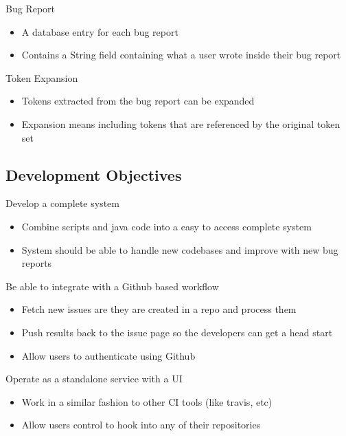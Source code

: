 \documentclass[ignorenonframetext,]{beamer}
\providecommand{\tightlist}{%
  \setlength{\itemsep}{0pt}\setlength{\parskip}{0pt}}
\begin{document}
\begin{frame}{Bug Report}

\begin{itemize}
\tightlist
\item
  A database entry for each bug report
\item
  Contains a String field containing what a user wrote inside their bug
  report
\end{itemize}

\end{frame}

\begin{frame}{Token Expansion}

\begin{itemize}
\tightlist
\item
  Tokens extracted from the bug report can be expanded
\item
  Expansion means including tokens that are referenced by the original
  token set
\end{itemize}

\end{frame}

\subsection{Development Objectives}\label{development-objectives}

\begin{frame}{Develop a complete system}

\begin{itemize}
\tightlist
\item
  Combine scripts and java code into a easy to access complete system
\item
  System should be able to handle new codebases and improve with new bug
  reports
\end{itemize}

\end{frame}

\begin{frame}{Be able to integrate with a Github based workflow}

\begin{itemize}
\tightlist
\item
  Fetch new issues are they are created in a repo and process them
\item
  Push results back to the issue page so the developers can get a head
  start
\item
  Allow users to authenticate using Github
\end{itemize}

\end{frame}

\begin{frame}{Operate as a standalone service with a UI}

\begin{itemize}
\tightlist
\item
  Work in a similar fashion to other CI tools (like travis, etc)
\item
  Allow users control to hook into any of their repositories
\end{itemize}

\end{frame}
\end{document}
